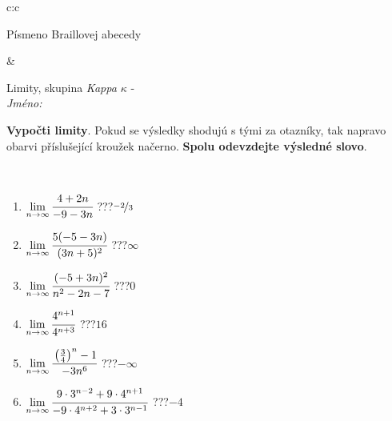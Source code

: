 \documentclass[10pt]{report}
\begin{document}
\begin{tabular}{c:c}
\begin{minipage}[c][104.5mm][t]{0.5\linewidth}
\begin{center}
\begin{minipage}{0.20\linewidth}
\begin{center}
{\small Písmeno Braillovej abecedy}
\end{center}
\end{minipage}
\end{center}
\end{minipage}
&
\begin{minipage}[c][104.5mm][t]{0.5\linewidth}
\begin{center}
\vspace{7mm}
{\huge Limity, skupina \textit{Kappa $\kappa$} -}\\[5mm]
\textit{Jméno:}\phantom{xxxxxxxxxxxxxxxxxxxxxxxxxxxxxxxxxxxxxxxxxxxxxxxxxxxxxxxxxxxxxxxxx}\\[5mm]
\begin{minipage}{0.95\linewidth}
\begin{center}
\textbf{Vypočti limity}. Pokud se výsledky shodujú s tými za otazníky, tak napravo\\obarvi příslušející kroužek načerno. \textbf{Spolu odevzdejte výsledné slovo}.
\end{center}
\end{minipage}
\\[1mm]
\begin{minipage}{0.79\linewidth}
\begin{center}
\begin{varwidth}{\linewidth}
\begin{enumerate}
\normalsize
\item $\lim\limits_{n\to\infty}\cfrac{4+2n}{-9-3n}$\quad \dotfill\; ???\;\dotfill \quad $\nicefrac{-2}{3}$
\item $\lim\limits_{n\to\infty}\cfrac{5(-5-3n)}{(3n+5)^2}$\quad \dotfill\; ???\;\dotfill \quad $\infty$
\item $\lim\limits_{n\to\infty}\cfrac{(-5+3n)^2}{n^2-2n-7}$\quad \dotfill\; ???\;\dotfill \quad $0$
\item $\lim\limits_{n\to\infty}\cfrac{4^{n+1}}{4^{n+3}}$\quad \dotfill\; ???\;\dotfill \quad $16$
\item $\lim\limits_{n\to\infty}\cfrac{\left(\frac{3}{4}\right)^n -1}{-3n^{6}}$\quad \dotfill\; ???\;\dotfill \quad $-\infty$
\item $\lim\limits_{n\to\infty}\cfrac{9\cdot 3^{n-2}+9\cdot 4^{n+1}}{-9\cdot 4^{n+2}+3\cdot 3^{n-1}}$\quad \dotfill\; ???\;\dotfill \quad $-4$
\end{enumerate}
\end{varwidth}
\end{center}
\end{minipage}
\begin{minipage}{0.20\linewidth}

\end{minipage}
\end{center}
\end{minipage}
\end{tabular}
\end{document}
